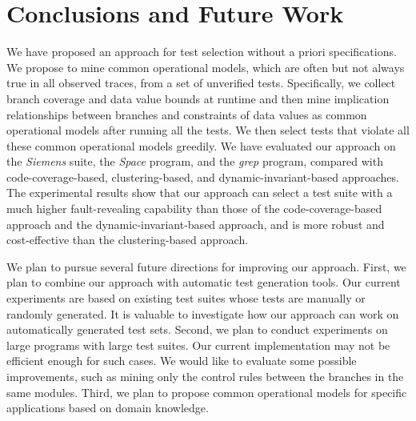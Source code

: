 \documentclass{sig-alternate}
\begin{document}
\section{Conclusions and Future Work}
\label{sec:conclusions}

We have proposed an approach for test selection without a priori
specifications. We propose to mine common operational models, which
are often but not always true in all observed traces, from a set of
unverified tests. Specifically, we collect branch coverage and data
value bounds at runtime and then mine implication relationships
between branches and constraints of data values as common
operational models after running all the tests. We then select tests
that violate all these common operational models greedily. We have
evaluated our approach on the {\it Siemens} suite, the {\it Space}
program, and the {\it grep} program, compared with
code-coverage-based, clustering-based, and dynamic-invariant-based
approaches. The experimental results show that our approach can
select a test suite with a much higher fault-revealing capability
than those of the code-coverage-based approach and the
dynamic-invariant-based approach, and is more robust and
cost-effective than the clustering-based approach.

We plan to pursue several future directions for improving our
approach. First, we plan to combine our approach with automatic test
generation tools. Our current experiments are based on existing test
suites whose tests are manually or randomly generated. It is
valuable to investigate how our approach can work on automatically
generated test sets. Second, we plan to conduct experiments on large
programs with large test suites. Our current implementation may not
be efficient enough for such cases. We would like to evaluate some
possible improvements, such as mining only the control rules between
the branches in the same modules. Third, we plan to propose common
operational models for specific applications based on domain
knowledge.







\end{document}
